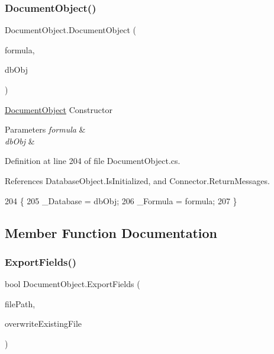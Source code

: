 \subsubsection{\texorpdfstring{Document\+Object()}{DocumentObject()}\hspace{0.1cm}{\footnotesize\ttfamily [3/3]}}
{\footnotesize\ttfamily Document\+Object.\+Document\+Object (\begin{DoxyParamCaption}\item[{string}]{formula,  }\item[{\hyperlink{class_database_object}{Database\+Object}}]{db\+Obj }\end{DoxyParamCaption})}



\hyperlink{class_document_object}{Document\+Object} Constructor 


\begin{DoxyParams}{Parameters}
{\em formula} & \\
\hline
{\em db\+Obj} & \\
\hline
\end{DoxyParams}


Definition at line 204 of file Document\+Object.\+cs.



References Database\+Object.\+Is\+Initialized, and Connector.\+Return\+Messages.


\begin{DoxyCode}
204                                                                 \{
205         \_Database = dbObj;
206         \_Formula = formula;
207     \}
\end{DoxyCode}


\subsection{Member Function Documentation}
\mbox{\label{class_document_object_a1a763aa01710b370634f46c89b7d2d8e}} 
\subsubsection{\texorpdfstring{Export\+Fields()}{ExportFields()}}
{\footnotesize\ttfamily bool Document\+Object.\+Export\+Fields (\begin{DoxyParamCaption}\item[{string}]{file\+Path,  }\item[{bool}]{overwrite\+Existing\+File }\end{DoxyParamCaption})}



